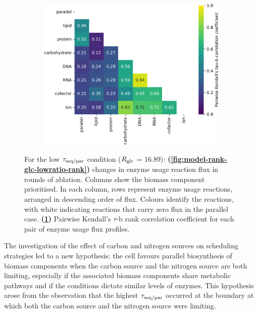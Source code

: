 \begin{figure}
\begin{subfigure}[t]{0.45\textwidth}
    \includegraphics[width=\linewidth]{CompareEnzUse_glc16p89_pyrUnres_ammUnres_2.pdf}
    \caption{
    }
    \label{fig:model-rank-glc-lowratio-kendall}
  \end{subfigure}

  \caption[
    Changes in enzyme usage reaction flux and Kendall's $\tau$-b rank correlation coefficient for each pair, $\exchrate{glc}$ = \SI{16.89}{\mmolgdwh}.
  ]{
    For the low $\tau_{\mathrm{seq}/\mathrm{par}}$ condition ($\exchrate{glc}$ = \SI{16.89}{\mmolgdwh}):
    \textbf{(\ref{fig:model-rank-glc-lowratio-rank})}
    changes in enzyme usage reaction flux in rounds of ablation.
    Columns show the biomass component prioritised.
    In each column, rows represent enzyme usage reactions, arranged in descending order of flux.
    Colours identify the reactions, with white indicating reactions that carry zero flux in the parallel case.
    \textbf{(\ref{fig:model-rank-glc-lowratio-kendall})}
    Pairwise Kendall's $\tau$-b rank correlation coefficient \parencite{kendallTREATMENTTIESRANKING1945} for each pair of enzyme usage flux profiles.
  }
  \label{fig:model-rank-glc-lowratio}
\end{figure}

The investigation of the effect of carbon and nitrogen sources on scheduling strategies led to a new hypothesis: the cell favours parallel biosynthesis of biomass components when the carbon source and the nitrogen source are both limiting, especially if the associated biomass components share metabolic pathways and if the conditions dictate similar levels of enzymes.
This hypothesis arose from the observation that the highest $\tau_{\mathrm{seq}/\mathrm{par}}$ occurred at the boundary at which both the carbon source and the nitrogen source were limiting.


